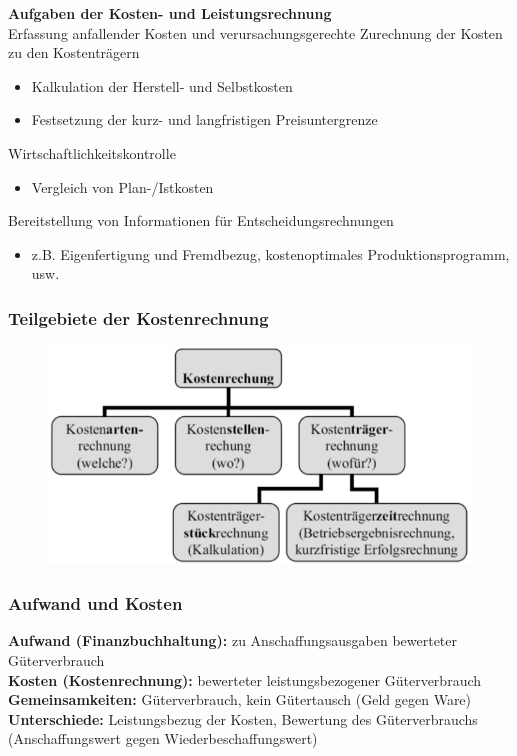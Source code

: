 \documentclass[a4paper,11pt, twoside]{article}
\begin{document}
\textbf{Aufgaben der Kosten- und Leistungsrechnung}\\
Erfassung anfallender Kosten und verursachungsgerechte Zurechnung der Kosten zu den Kostenträgern
\begin{itemize}
	\item Kalkulation der Herstell- und Selbstkosten
	\item Festsetzung der kurz- und langfristigen Preisuntergrenze
\end{itemize}
Wirtschaftlichkeitskontrolle
\begin{itemize}
	\item Vergleich von Plan-/Istkosten
\end{itemize}
Bereitstellung von Informationen für Entscheidungsrechnungen
\begin{itemize}
	\item z.B. Eigenfertigung und Fremdbezug, kostenoptimales Produktionsprogramm, usw.
\end{itemize}

\subsubsection*{Teilgebiete der Kostenrechnung}
\begin{figure}[h]
 \begin{center}
   \includegraphics[scale=0.3]{bilder/kostenrechnung.png}
 \end{center}
\end{figure}

\subsubsection*{Aufwand und Kosten}
\textbf{Aufwand (Finanzbuchhaltung):} zu Anschaffungsausgaben bewerteter Güterverbrauch\\
\textbf{Kosten (Kostenrechnung):} bewerteter leistungsbezogener Güterverbrauch\\
\textbf{Gemeinsamkeiten:} Güterverbrauch, kein Gütertausch (Geld gegen Ware)\\
\textbf{Unterschiede:} Leistungsbezug der Kosten, Bewertung des Güterverbrauchs (Anschaffungswert gegen Wiederbeschaffungswert)
\end{document}
